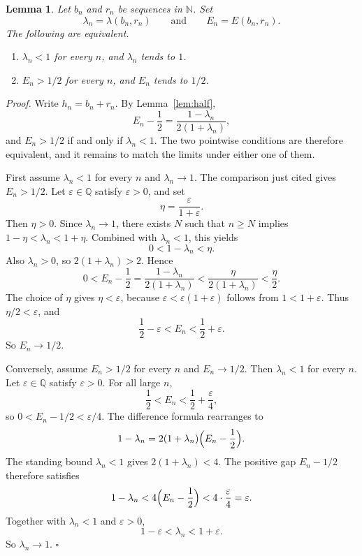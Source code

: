 \documentclass[11pt,letterpaper]{article}
\newcommand{\N}{\mathbb{N}}
\newcommand{\Q}{\mathbb{Q}}
\newtheorem{lemma}[theorem]{Lemma}
\newenvironment{proof}{\noindent\textit{Proof.}}{\hfill\(\square\)}
\begin{document}
\begin{lemma}
\label{lem:sequence}
Let \(b_{n}\) and \(r_{n}\) be sequences in \(\N\). Set
\[
\lambda_{n}=\lambda(b_{n},r_{n})
\qquad\text{and}\qquad
E_{n}=E(b_{n},r_{n}).
\]
The following are equivalent.
\begin{enumerate}[label=\textup{(\roman*)}]
\item \(\lambda_{n}<1\) for every \(n\), and \(\lambda_{n}\) tends to \(1\).
\item \(E_{n}>1/2\) for every \(n\), and \(E_{n}\) tends to \(1/2\).
\end{enumerate}
\end{lemma}

\begin{proof}
Write \(h_{n}=b_{n}+r_{n}\). By Lemma~\ref{lem:half},
\[
E_{n}-\frac{1}{2}=\frac{1-\lambda_{n}}{2(1+\lambda_{n})},
\]
and \(E_{n}>1/2\) if and only if \(\lambda_{n}<1\). The two pointwise conditions are therefore equivalent, and it remains to match the limits under either one of them.

First assume \(\lambda_{n}<1\) for every \(n\) and \(\lambda_{n}\to 1\). The comparison just cited gives \(E_{n}>1/2\). Let \(\varepsilon\in\Q\) satisfy \(\varepsilon>0\), and set
\[
\eta=\frac{\varepsilon}{1+\varepsilon}.
\]
Then \(\eta>0\). Since \(\lambda_{n}\to 1\), there exists \(N\) such that \(n\geq N\) implies \(1-\eta<\lambda_{n}<1+\eta\). Combined with \(\lambda_{n}<1\), this yields
\[
0<1-\lambda_{n}<\eta.
\]
Also \(\lambda_{n}>0\), so \(2(1+\lambda_{n})>2\). Hence
\[
0<E_{n}-\frac{1}{2}
=\frac{1-\lambda_{n}}{2(1+\lambda_{n})}
<\frac{\eta}{2(1+\lambda_{n})}
<\frac{\eta}{2}.
\]
The choice of \(\eta\) gives \(\eta<\varepsilon\), because \(\varepsilon<\varepsilon(1+\varepsilon)\) follows from \(1<1+\varepsilon\). Thus \(\eta/2<\varepsilon\), and
\[
\frac{1}{2}-\varepsilon<E_{n}<\frac{1}{2}+\varepsilon.
\]
So \(E_{n}\to 1/2\).

Conversely, assume \(E_{n}>1/2\) for every \(n\) and \(E_{n}\to 1/2\). Then \(\lambda_{n}<1\) for every \(n\). Let \(\varepsilon\in\Q\) satisfy \(\varepsilon>0\). For all large \(n\),
\[
\frac{1}{2}<E_{n}<\frac{1}{2}+\frac{\varepsilon}{4},
\]
so \(0<E_{n}-1/2<\varepsilon/4\). The difference formula rearranges to
\[
1-\lambda_{n}=2(1+\lambda_{n})\Bigl(E_{n}-\frac{1}{2}\Bigr).
\]
The standing bound \(\lambda_{n}<1\) gives \(2(1+\lambda_{n})<4\). The positive gap \(E_{n}-1/2\) therefore satisfies
\[
1-\lambda_{n}
<4\Bigl(E_{n}-\frac{1}{2}\Bigr)
<4\cdot\frac{\varepsilon}{4}
=\varepsilon.
\]
Together with \(\lambda_{n}<1\) and \(\varepsilon>0\),
\[
1-\varepsilon<\lambda_{n}<1+\varepsilon.
\]
So \(\lambda_{n}\to 1\).
\end{proof}
\end{document}
